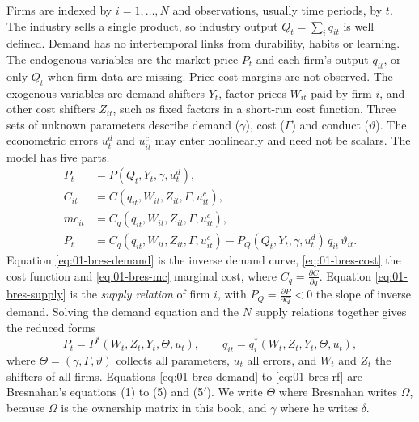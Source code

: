 Firms are indexed by $i = 1, \dots, N$ and observations, usually time periods, by $t$. The industry sells a single
product, so industry output $Q_t = \sum_i q_{it}$ is well defined. Demand has no intertemporal links from durability,
habits or learning. The endogenous variables are the market price $P_t$ and each firm's output $q_{it}$, or only
$Q_t$ when firm data are missing. Price-cost margins are not observed. The exogenous variables are demand shifters
$Y_t$, factor prices $W_{it}$ paid by firm $i$, and other cost shifters $Z_{it}$, such as fixed factors in a short-run
cost function. Three sets of unknown parameters describe demand ($\gamma$), cost ($\Gamma$) and conduct
($\vartheta$). The econometric errors $u^d_t$ and $u^c_{it}$ may enter nonlinearly and need not be scalars. The model
has five parts.
\begin{align}
P_t &= P(Q_t, Y_t, \gamma, u^d_t), \label{eq:01-bres-demand}\\
C_{it} &= C(q_{it}, W_{it}, Z_{it}, \Gamma, u^c_{it}), \label{eq:01-bres-cost}\\
mc_{it} &= C_q(q_{it}, W_{it}, Z_{it}, \Gamma, u^c_{it}), \label{eq:01-bres-mc}\\
P_t &= C_q(q_{it}, W_{it}, Z_{it}, \Gamma, u^c_{it}) - P_Q(Q_t, Y_t, \gamma, u^d_t)\, q_{it}\, \vartheta_{it}.
  \label{eq:01-bres-supply}
\end{align}
Equation \eqref{eq:01-bres-demand} is the inverse demand curve, \eqref{eq:01-bres-cost} the cost function and
\eqref{eq:01-bres-mc} marginal cost, where $C_q = \frac{\partial C}{\partial q}$. Equation \eqref{eq:01-bres-supply}
is the \emph{supply relation} of firm $i$, with $P_Q = \frac{\partial P}{\partial Q} < 0$ the slope of inverse
demand. Solving the demand equation and the $N$ supply relations together gives the reduced forms
\begin{equation}\label{eq:01-bres-rf}
P_t = P^*(W_t, Z_t, Y_t, \Theta, u_t), \qquad q_{it} = q_i^*(W_t, Z_t, Y_t, \Theta, u_t),
\end{equation}
where $\Theta = (\gamma, \Gamma, \vartheta)$ collects all parameters, $u_t$ all errors, and $W_t$ and $Z_t$ the
shifters of all firms. Equations \eqref{eq:01-bres-demand} to \eqref{eq:01-bres-rf} are Bresnahan's equations (1) to
(5) and (5$'$). We write $\Theta$ where Bresnahan writes $\Omega$, because $\Omega$ is the ownership matrix in this
book, and $\gamma$ where he writes $\delta$.

